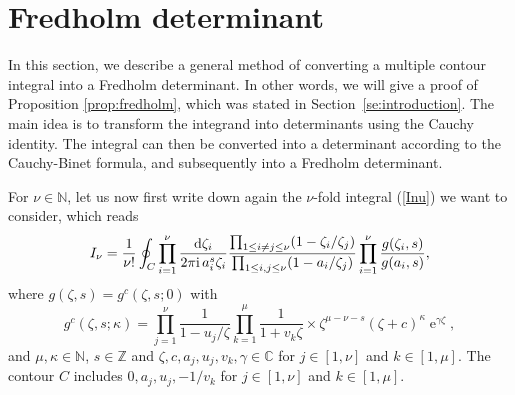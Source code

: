\documentclass[cmp]{svjour}
\numberwithin{theorem}{section}
\numberwithin{equation}{section}
\DeclareMathOperator{\e}{e}
\def\dd{{\rm d}}
\def\ii{{\rm i}}
\begin{document}
\section{Fredholm determinant}
\label{se:tofredholm}
In this section, we describe a general method of converting a multiple contour integral into a Fredholm determinant.  
In other words, we will give a proof of Proposition \ref{prop:fredholm}, which was stated in Section~\ref{se:introduction}.
The main idea is to transform the integrand into determinants using the Cauchy identity. The integral can then be converted into a determinant according to the Cauchy-Binet formula, and subsequently into a Fredholm determinant.

For $\nu\in\mathbb{N}$, let us now first 
write down again the $\nu$-fold integral (\ref{Inu}) we want to consider, which reads 
\begin{equation}
\label{Inu2}
I_\nu
=
\frac{1}{\nu!} \oint_C \prod_{i=1}^{\nu}
\frac{\dd \zeta_i}{2\pi \ii\,a_i^s \zeta_i}
\frac{\prod_{1\le i\neq j\le \nu} (1-\zeta_i/\zeta_j)}{\prod_{1\le i,j\le \nu}(1-a_i/\zeta_j)}
\prod_{i=1}^{\nu} \frac{g(\zeta_i,s)}{g(a_i,s)},
\end{equation}
where $g(\zeta,s)=g^c(\zeta,s;0)$ with
\begin{equation} 
g^c(\zeta,s ; \kappa) = \prod_{j=1}^\nu \frac{1}{1-u_j/\zeta}
\prod_{k=1}^\mu \frac{1}{1+v_k \zeta} \times \zeta^{\mu-\nu-s}  
{(\zeta + c)}^\kappa \e^{\gamma\zeta},
\label{gmndef2} 
\end{equation}
and $\mu,\kappa\in\mathbb{N}$, $s\in\mathbb{Z}$ and $\zeta,c,a_j, u_j,v_k,\gamma\in\mathbb{C}$ for $j\in [1,\nu]$ and $k\in [1,\mu]$. 
The contour $C$ includes $0,a_j,u_j,-1/v_k$ for $j\in [1,\nu]$ and $k\in [1,\mu]$.
\end{document}
